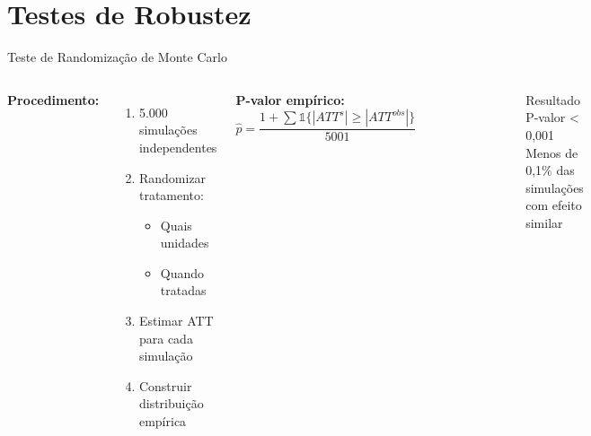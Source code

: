 \documentclass[10pt,aspectratio=169]{beamer}
\begin{document}
\section{Testes de Robustez}

\begin{frame}{Teste de Randomização de Monte Carlo}
\begin{columns}
\textbf{Procedimento:}
\begin{enumerate}
    \item 5.000 simulações independentes
    \item Randomizar tratamento:
    \begin{itemize}
        \item Quais unidades
        \item Quando tratadas
    \end{itemize}
    \item Estimar ATT para cada simulação
    \item Construir distribuição empírica
\end{enumerate}

\vspace{0.3cm}
\textbf{P-valor empírico:}
$$\hat{p} = \frac{1 + \sum \mathbb{1}\{|ATT^s| \geq |ATT^{obs}|\}}{5001}$$

\begin{figure}
\centering
\includegraphics[width=\textwidth]{../../../data/outputs/placebo_distribution.png}
\end{figure}

\begin{alertblock}{Resultado}
P-valor < 0,001\\
Menos de 0,1\% das simulações com efeito similar
\end{alertblock}
\end{columns}
\end{frame}
\end{document}
